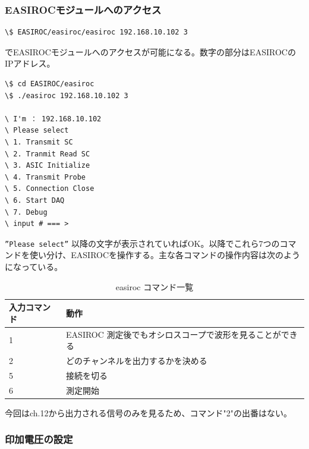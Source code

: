 \documentclass[uplatex,10pt,a4j]{jsarticle}
\begin{document}
\subsubsection{EASIROCモジュールへのアクセス}

\begin{lstlisting}[caption=EASIROCモジュールへのアクセス]
  \$ EASIROC/easiroc/easiroc 192.168.10.102 3
\end{lstlisting}
でEASIROCモジュールへのアクセスが可能になる。数字の部分はEASIROCのIPアドレス。

\begin{lstlisting}
\$ cd EASIROC/easiroc
\$ ./easiroc 192.168.10.102 3

\ I'm ： 192.168.10.102
\ Please select
\ 1. Transmit SC
\ 2. Tranmit Read SC
\ 3. ASIC Initialize
\ 4. Transmit Probe
\ 5. Connection Close
\ 6. Start DAQ
\ 7. Debug
\ input # === >
\end{lstlisting}
{\tt ”Please select''} 以降の文字が表示されていればOK。以降でこれら7つのコマンドを使い分け、EASIROCを操作する。主な各コマンドの操作内容は次のようになっている。

\begin{table}[htbp]
  \begin{center}
    \caption{easiroc コマンド一覧}
    \begin{tabular}{|l|l|} \hline
      入力コマンド & 動作                                                     \\ \hline \hline
      1            & EASIROC 測定後でもオシロスコープで波形を見ることができる \\ \hline
      2            & どのチャンネルを出力するかを決める                       \\ \hline
      5            & 接続を切る                                               \\ \hline
      6            & 測定開始                                                 \\ \hline
    \end{tabular}
  \end{center}
\end{table}

今回はch.12から出力される信号のみを見るため、コマンド"2"の出番はない。

\subsubsection{印加電圧の設定}
\end{document}

